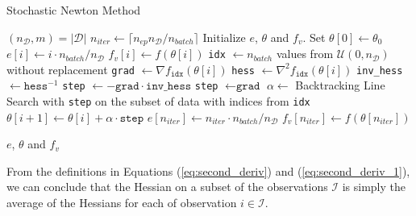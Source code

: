 \documentclass[conference]{IEEEtran}
\let\oldReturn\Return
\renewcommand{\Return}{\State\oldReturn}
\begin{document}
\begin{algorithm*}[t]
\caption{Stochastic Newton Method}\label{algo:snm}
\begin{algorithmic}[1]
\State $(n_{\mathcal{D}}, m) = |\mathcal{D}|$ 
\State $n_{iter} \gets \lceil n_{ep}n_{\mathcal{D}}/n_{batch} \rceil$ 
\State Initialize $e$, $\theta$ and $f_v$. Set $\theta[0] \gets \theta_{0}$
\State $e[i] \gets i\cdot n_{batch} /n_{\mathcal{D}}$ 
\State $f_{v}[i] \gets f(\theta[i])$ 
\State \texttt{idx} $\gets n_{batch} $ values from $\mathcal{U}(0, n_{\mathcal{D}})$ without replacement
\State \texttt{grad} $\gets \nabla f_{\texttt{idx}}(\theta[i])$ 
\State \texttt{hess} $\gets \nabla^2 f_{\texttt{idx}}(\theta[i])$ 
\State \texttt{inv\_hess} $\gets \texttt{hess}^{-1}$
\State \texttt{step} $\gets -\texttt{grad} \cdot \texttt{inv\_hess}$
\Else 
\State \texttt{step} $\gets \texttt{grad}$
\EndIf
\State $\alpha \gets $ Backtracking Line Search with \texttt{step} on the subset of data  with indices from \texttt{idx}
\State $\theta[i+1] \gets \theta[i] + \alpha \cdot \texttt{step}$
\EndFor
\State $e[n_{iter}] \gets n_{iter}\cdot n_{batch} /n_{\mathcal{D}}$
\State $f_{v}[n_{iter}] \gets f(\theta[n_{iter}])$

\Return $e$, $\theta$ and $f_v$
\EndFunction
\end{algorithmic}
\end{algorithm*}

From the definitions in Equations (\ref{eq:second_deriv}) and (\ref{eq:second_deriv_1}), we can conclude that the Hessian on a subset of the observations $\mathcal{I}$ is simply the average of the Hessians for each of observation $i\in\mathcal{I}$. \\
\end{document}
